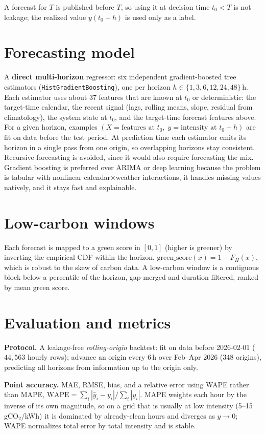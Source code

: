 \documentclass[10pt,a4paper]{article}
\begin{document}
A forecast for $T$ is published before $T$, so using it at decision time
$t_0<T$ is not leakage; the realized value $y(t_0{+}h)$ is used only as a label.

\section{Forecasting model}
A \textbf{direct multi-horizon} regressor: six independent gradient-boosted tree
estimators (\texttt{HistGradientBoosting}), one per horizon
$h\in\{1,3,6,12,24,48\}$\,h. Each estimator uses about 37 features that are known
at $t_0$ or deterministic: the target-time calendar, the recent signal (lags,
rolling means, slope, residual from climatology), the system state at $t_0$, and
the target-time forecast features above. For a given horizon, examples
$(X=\text{features at }t_0,\; y=\text{intensity at }t_0{+}h)$ are fit on data
before the test period. At prediction time each estimator emits its horizon in a
single pass from one origin, so overlapping horizons stay consistent. Recursive
forecasting is avoided, since it would also require forecasting the mix. Gradient
boosting is preferred over ARIMA or deep learning because the problem is tabular
with nonlinear calendar$\times$weather interactions, it handles missing values
natively, and it stays fast and explainable.

\section{Low-carbon windows}
Each forecast is mapped to a green score in $[0,1]$ (higher is greener) by
inverting the empirical CDF within the horizon, $\text{green\_score}(x)=1-F_H(x)$,
which is robust to the skew of carbon data. A low-carbon window is a contiguous
block below a percentile of the horizon, gap-merged and duration-filtered, ranked
by mean green score.

\section{Evaluation and metrics}
\textbf{Protocol.} A leakage-free \emph{rolling-origin} backtest: fit on data
before 2026-02-01 ($44{,}563$ hourly rows); advance an origin every 6\,h over
Feb--Apr 2026 (348 origins), predicting all horizons from information up to the
origin only.

\textbf{Point accuracy.} MAE, RMSE, bias, and a relative error using WAPE rather
than MAPE, $\text{WAPE}=\sum_i|\hat y_i-y_i|/\sum_i|y_i|$. MAPE weights each hour
by the inverse of its own magnitude, so on a grid that is usually at low
intensity (5--15\,gCO$_2$/kWh) it is dominated by already-clean hours and diverges
as $y\!\to\!0$; WAPE normalizes total error by total intensity and is stable.
\end{document}
